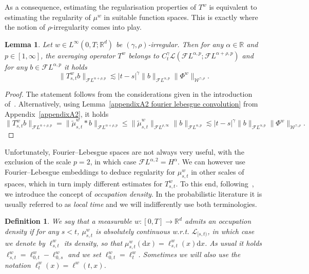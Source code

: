 \documentclass[10pt]{article}
\newcommand{\mathd}{\mathrm{d}}
\newcommand{\tmtextit}[1]{{\itshape{#1}}}
\newtheorem{definition}[theorem]{Definition}
\newtheorem{lemma}[theorem]{Lemma}
\begin{document}
As a consequence, estimating the regularisation properties of $T^w$ is
equivalent to estimating the regularity of $\mu^w$ in suitable function
spaces. This is exactly where the notion of $\rho$\mbox{-}irregularity comes
into play.

\begin{lemma}
  \label{sec2.2 lemma regularity averaging 1}Let $w \in L^{\infty} (0, T ;
  \mathbb{R}^d)$ be $(\gamma, \rho)$\mbox{-}irregular. Then for any $\alpha
  \in \mathbb{R}$ and $p \in [1, \infty]$, the averaging operator $T^w$
  belongs to $C^{\gamma}_t \mathcal{L} (\mathcal{F} L^{\alpha, p} ;
  \mathcal{F} L^{\alpha + \rho, p})$ and for any $b \in \mathcal{F} L^{\alpha,
  p}$ it holds
  \begin{equation}
    \| T^w_{s, t} b \|_{\mathcal{F} L^{\alpha + \rho, p}} \lesssim | t - s
    |^{\gamma} \| b \|_{\mathcal{F} L^{\alpha, p}} \| \Phi^w
    \|_{\mathcal{W}^{\gamma, \rho}} .
  \end{equation}
\end{lemma}

\begin{proof}
  The statement follows from the considerations given in the introduction
  of~{\cite{catelliergubinelli}}. Alternatively, using Lemma~\ref{appendixA2
  fourier lebesgue convolution} from Appendix~\ref{appendixA2}, it holds
  \[ \| T^w_{s, t} b \|_{\mathcal{F} L^{\alpha + \rho, p}} = \|
     \tilde{\mu}^w_{s, t} \ast b \|_{\mathcal{F} L^{\alpha + \rho, p}}
     \leqslant \| \tilde{\mu}^w_{s, t} \|_{\mathcal{F} L^{\rho, \infty}}  \| b
     \|_{\mathcal{F} L^{\alpha, p}} \lesssim | t - s |^{\gamma} \| b
     \|_{\mathcal{F} L^{\alpha, p}} \| \Phi^w \|_{\mathcal{W}^{\gamma, \rho}}
     . \]
\end{proof}

Unfortunately, Fourier--Lebesgue spaces are not always very useful, with the
exclusion of the scale $p = 2$, in which case $\mathcal{F} L^{\alpha, 2} =
H^{\alpha}$. We can however use Fourier--Lebesgue embeddings to deduce
regularity for $\mu^w_{s, t}$ in other scales of spaces, which in turn imply
different estimates for $T^w_{s, t}$. To this end, following~{\cite{geman}},
we introduce the concept of \tmtextit{occupation density}. In the
probabilistic literature it is usually referred to as \tmtextit{local time}
and we will indifferently use both terminologies.

\begin{definition}
  \label{sec2.2 defn occupation density}We say that a measurable $w : [0, T]
  \rightarrow \mathbb{R}^d$ admits an occupation density if for any $s < t$,
  $\mu^w_{s, t}$ is absolutely continuous w.r.t. $\mathcal{L}_{[s, t)}$, in
  which case we denote by $\ell^w_{s, t}$ its density, so that $\mu^w_{s, t}
  (\mathd x) = \ell^w_{s, t} (x) \mathd x$. As usual it holds $\ell^w_{s, t} =
  \ell^w_{0, t} - \ell^w_{0, s}$ and we set $\ell^w_{0, t} = \ell^w_t$.
  Sometimes we will also use the notation $\ell^w_t (x) = \ell^w (t, x)$.
\end{definition}
\end{document}
